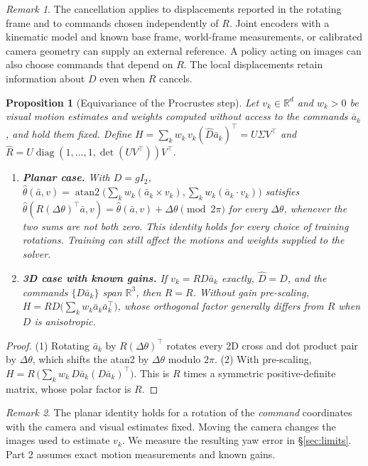 \documentclass{article}
\theoremstyle{plain}
\newtheorem{proposition}{Proposition}
\theoremstyle{remark}
\newtheorem{remark}{Remark}
\begin{document}
\begin{remark}
The cancellation applies to displacements reported in the rotating frame and to commands chosen independently of $R$. Joint encoders with a kinematic model and known base frame, world-frame measurements, or calibrated camera geometry can supply an external reference. A policy acting on images can also choose commands that depend on $R$. The local displacements retain information about $D$ even when $R$ cancels.
\end{remark}

\begin{proposition}[Equivariance of the Procrustes step]
\label{prop:equiv}
Let $v_k \in \mathbb{R}^d$ and $w_k > 0$ be visual motion estimates and weights computed without access to the commands $\bar{a}_k$, and hold them fixed. Define $H = \sum_k w_k\, v_k (\hat{D}\bar{a}_k)^\top = U\Sigma V^\top$ and $\hat{R} = U \operatorname{diag}(1, \dots, 1, \det(UV^\top)) V^\top$.
\begin{enumerate}
  \item \textbf{Planar case.} With $D = gI_2$, $\hat\theta(\bar a, v) = \operatorname{atan2}\big(\sum_k w_k (\bar{a}_k \times v_k), \sum_k w_k (\bar{a}_k \cdot v_k)\big)$ satisfies $\hat\theta(R(\Delta\theta)^\top \bar a, v) = \hat\theta(\bar a, v) + \Delta\theta \pmod{2\pi}$ for every $\Delta\theta$, whenever the two sums are not both zero. This identity holds for every choice of training rotations. Training can still affect the motions and weights supplied to the solver.
  \item \textbf{3D case with known gains.} If $v_k = R D \bar{a}_k$ exactly, $\hat{D} = D$, and the commands $\{D\bar a_k\}$ span $\mathbb{R}^3$, then $\hat{R} = R$. Without gain pre-scaling, $H = R D \big(\sum_k w_k \bar{a}_k \bar{a}_k^\top\big)$, whose orthogonal factor generally differs from $R$ when $D$ is anisotropic.
\end{enumerate}
\end{proposition}
\begin{proof}
(1) Rotating $\bar a_k$ by $R(\Delta\theta)^\top$ rotates every 2D cross and dot product pair by $\Delta\theta$, which shifts the atan2 by $\Delta\theta$ modulo $2\pi$. (2) With pre-scaling, $H = R\,\big(\sum_k w_k\, D\bar a_k (D\bar a_k)^\top\big)$. This is $R$ times a symmetric positive-definite matrix, whose polar factor is $R$.
\end{proof}

\begin{remark}
The planar identity holds for a rotation of the \emph{command} coordinates with the camera and visual estimates fixed. Moving the camera changes the images used to estimate $v_k$. We measure the resulting yaw error in \S\ref{sec:limits}. Part 2 assumes exact motion measurements and known gains.
\end{remark}
\end{document}
